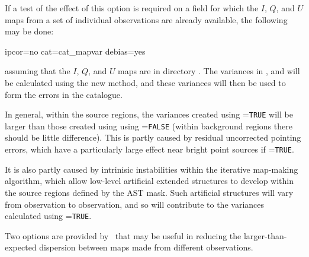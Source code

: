 If a test of the effect of this option is required on a field for which
the $I$, $Q$, and $U$ maps from a set of individual observations are already
available, the following may be done:

\begin{terminalv}
                   ipcor=no cat=cat_mapvar debias=yes
\end{terminalv}

assuming that the $I$, $Q$, and $U$ maps are in directory . The
variances in ,  and
 will be calculated using the new method, and
these variances will then be used to form the errors in the
 catalogue.

In general, within the source regions, the variances created using
=\texttt{TRUE} will be larger than those created using
using =\texttt{FALSE} (within background regions there
should be little difference).  This is partly caused by residual
uncorrected pointing errors, which have a particularly large effect near
bright point sources if =\texttt{TRUE}.

It is also partly caused by intrinisic instabilities within the iterative
map-making algorithm, which allow low-level artificial extended structures
to develop within the source regions defined by the AST mask. Such
artificial structures will vary from observation to observation, and so
will contribute to the variances calculated using =\texttt{TRUE}.

Two options are provided by \poltwomap\ that may be useful in reducing
the larger-than-expected dispersion between maps made from different
observations.

